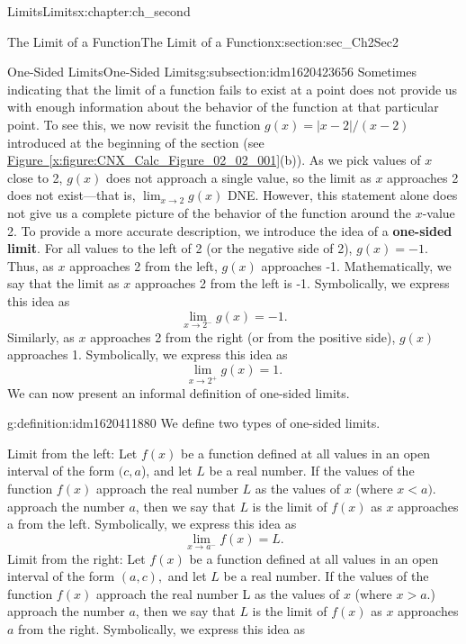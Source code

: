 \documentclass[oneside,10pt,]{book}
\newcommand{\xreffont}{\relax}
\newcommand{\terminology}[1]{\textbf{#1}}
\numberwithin{equation}{section}
\newcommand{\lt}{<}
\newcommand{\gt}{>}
\begin{document}
\begin{chapterptx}{Limits}{}{Limits}{}{}{x:chapter:ch_second}
\begin{sectionptx}{The Limit of a Function}{}{The Limit of a Function}{}{}{x:section:sec_Ch2Sec2}
\begin{subsectionptx}{One-Sided Limits}{}{One-Sided Limits}{}{}{g:subsection:idm1620423656}
Sometimes indicating that the limit of a function fails to exist at a point does not provide us with enough information about the behavior of the function at that particular point. To see this, we now revisit the function \(g(x)=|x-2|/(x-2)\) introduced at the beginning of the section (see \hyperref[x:figure:CNX_Calc_Figure_02_02_001]{Figure~{\xreffont\ref{x:figure:CNX_Calc_Figure_02_02_001}}}(b)). As we pick values of \(x\) close to 2, \(g(x)\) does not approach a single value, so the limit as \(x\) approaches 2 does not exist—that is, \(\lim_{x\to2}g(x)\) DNE. However, this statement alone does not give us a complete picture of the behavior of the function around the \(x\)-value 2. To provide a more accurate description, we introduce the idea of a \terminology{one-sided limit}. For all values to the left of 2 (or the negative side of 2), \(g(x)=-1.\) Thus, as \(x\) approaches 2 from the left, \(g(x)\) approaches -1. Mathematically, we say that the limit as \(x\) approaches 2 from the left is -1. Symbolically, we express this idea as%
%
\begin{equation*}
\lim_{x\to 2^- }g(x)=-1.
\end{equation*}
Similarly, as \(x\) approaches 2 from the right (or from the positive side), \(g(x)\) approaches 1. Symbolically, we express this idea as%
%
\begin{equation*}
\lim_{x\to 2^+ }g(x)=1.
\end{equation*}
We can now present an informal definition of one-sided limits.%
\begin{definition}{}{g:definition:idm1620411880}%
We define two types of one-sided limits.%
\par
Limit from the left: Let \(f(x)\) be a function defined at all values in an open interval of the form \((c,a \)), and let \(L \) be a real number. If the values of the function \(f(x)\) approach the real number \(L \) as the values of \(x\) (where \(x\lt a ).\) approach the number \(a \), then we say that \(L \) is the limit of \(f(x)\) as \(x\) approaches a from the left. Symbolically, we express this idea as%
%
\begin{equation*}
\lim_{x\to a^{-} }f(x)=L.
\end{equation*}
Limit from the right: Let \(f(x)\) be a function defined at all values in an open interval of the form \((a,c),\) and let \(L \) be a real number. If the values of the function \(f(x)\) approach the real number L as the values of \(x\) (where \(x\gt a .\)) approach the number \(a \), then we say that \(L \) is the limit of \(f(x)\) as \(x\) approaches \(a \) from the right. Symbolically, we express this idea as%

\end{definition}
\end{subsectionptx}
\end{sectionptx}
\end{chapterptx}
\end{document}
